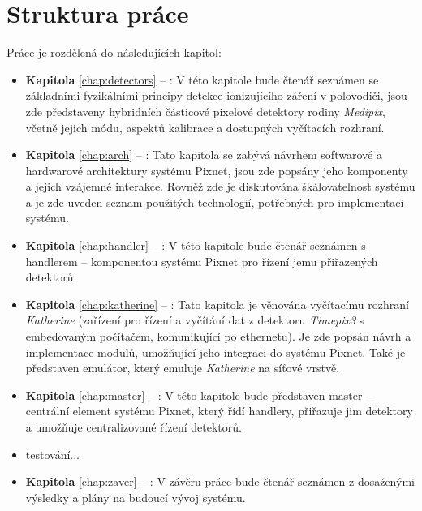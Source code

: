 \section{Struktura práce}
Práce je rozdělená do následujících kapitol:
\begin{itemize}
    
    \item \textbf{Kapitola} \ref{chap:detectors} -- : V této kapitole bude čtenář seznámen se základními fyzikálními principy detekce ionizujícího záření v polovodiči, jsou zde představeny hybridních částicové pixelové detektory rodiny \textit{Medipix}, včetně jejich módu, aspektů kalibrace a dostupných vyčítacích rozhraní.
    
    \item \textbf{Kapitola} \ref{chap:arch} -- : Tato kapitola se zabývá návrhem softwarové a hardwarové architektury systému Pixnet, jsou zde popsány jeho komponenty a jejich vzájemné interakce. Rovněž zde je diskutována škálovatelnost systému a je zde uveden seznam použitých technologií, potřebných pro implementaci systému.
    
    \item \textbf{Kapitola} \ref{chap:handler} -- : V této kapitole bude čtenář seznámen s handlerem -- komponentou systému Pixnet pro řízení jemu přiřazených detektorů.
    
    \item \textbf{Kapitola} \ref{chap:katherine} -- : Tato kapitola je věnována vyčítacímu rozhraní \textit{Katherine} (zařízení pro řízení a vyčítání dat z detektoru \textit{Timepix3} s embedovaným počítačem, komunikující po ethernetu). Je zde popsán návrh a implementace modulů, umožňující jeho integraci do systému Pixnet. Také je představen emulátor, který emuluje \textit{Katherine} na síťové vrstvě.
    
    \item \textbf{Kapitola} \ref{chap:master} -- : V této kapitole bude představen master -- centrální element systému Pixnet, který řídí handlery, přiřazuje jim detektory a umožňuje centralizované řízení detektorů.
    
    \item \todo testování...
    
    \item \textbf{Kapitola} \ref{chap:zaver} -- : V závěru práce bude čtenář seznámen z dosaženými výsledky a plány na budoucí vývoj systému.

\end{itemize}